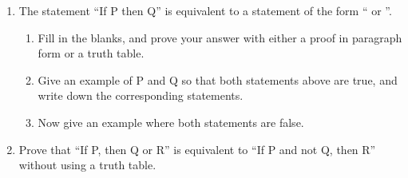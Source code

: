 \begin{enumerate}

    \item The statement ``If P then Q'' is equivalent to a statement of the form ``\underline{\hspace{.5in}} or \underline{\hspace{.5in}}''.
  \begin{enumerate}
      \item Fill in the blanks, and prove your answer with either a proof in paragraph form or a truth table.
      \item Give an example of P and Q so that both statements above are true, and write down the corresponding statements.
      \item Now give an example where both statements are false.
  \end{enumerate}

    \item Prove that ``If P, then Q or R'' is equivalent to ``If P and not Q, then R'' without using a truth table.
\end{enumerate}
